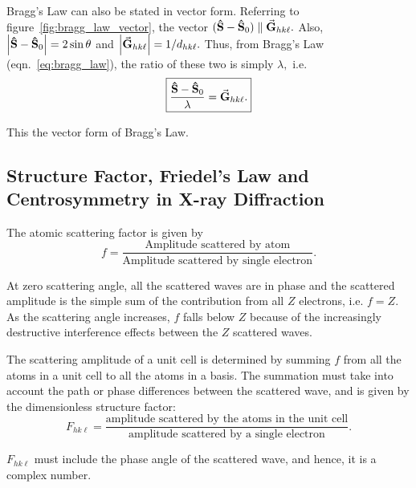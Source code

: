 Bragg's Law can also be stated in vector form. Referring to figure~\ref{fig:bragg_law_vector}, the vector $(\vu{S} - \vu{S}_0) \parallel \va{G}_{hk\ell}.$ Also, $\abs{ \vu{S} - \vu{S}_0 } = 2 \sin \theta$ and $\abs{\va{G}_{hk\ell}} = 1 / d_{hk\ell}.$ Thus, from Bragg's Law (eqn.~\eqref{eq:bragg_law}), the ratio of these two is simply $\lambda,$ i.e.%
%
\begin{equation}
\boxed{\dfrac{\vu{S} - \vu{S}_0}{\lambda} = \va{G}_{hk\ell}.} \label{eq:bragg_law_vector}
\end{equation}

This the vector form of Bragg's Law.


\subsection{Structure Factor, Friedel's Law and Centrosymmetry in X-ray Diffraction}

	The atomic scattering factor is given by%
%	
	\begin{equation}
	f = \dfrac{\text{Amplitude scattered by atom}}{\text{Amplitude scattered by single electron}}.
	\end{equation}
	
	At zero scattering angle, all the scattered waves are in phase and the scattered amplitude is the simple sum of the contribution from all $Z$ electrons, i.e. $f = Z$. As the scattering angle increases, $f$ falls below $Z$ because of the increasingly destructive interference effects between the $Z$ scattered waves.

	The scattering amplitude of a unit cell is determined by summing $f$ from all the atoms in a unit cell to all the atoms in a basis. The summation must take into account the path or phase differences between the scattered wave, and is given by the dimensionless structure factor:%
%	
	\begin{equation}
	F_{hk\ell} = \dfrac{\text{amplitude scattered by the atoms in the unit cell}}{\text{amplitude scattered by a single electron}}.
	\end{equation}
	
	$F_{hk\ell}$ must include the phase angle of the scattered wave, and hence, it is a complex number.
	
